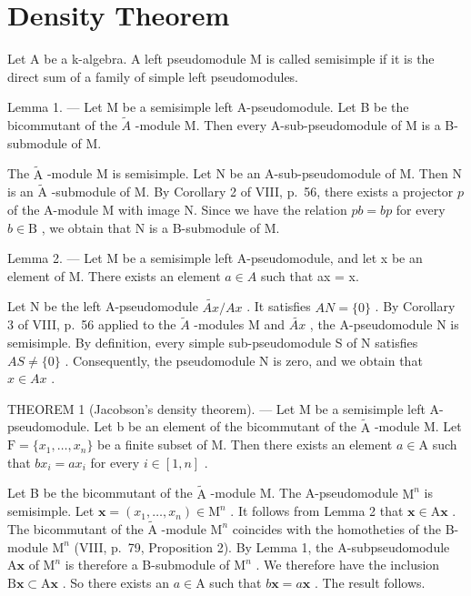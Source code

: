 \section{Density Theorem}

Let A be a k-algebra. A left pseudomodule M is called semisimple if it is the direct sum of a family of simple left pseudomodules.

Lemma 1. --- Let M be a semisimple left A-pseudomodule. Let B be the bicommutant of the \(\widetilde{A}\) -module M. Then every A-sub-pseudomodule of M is a B-submodule of M.

The \(\widetilde{\mathrm{A}}\) -module M is semisimple. Let N be an A-sub-pseudomodule of M. Then N is an \(\widetilde{\mathrm{A}}\) -submodule of M. By Corollary 2 of VIII, p.~56, there exists a projector \(p\) of the A-module M with image N. Since we have the relation \(pb = bp\) for every \(b \in \mathrm{B}\) , we obtain that N is a B-submodule of M.

Lemma 2. --- Let M be a semisimple left A-pseudomodule, and let x be an element of M. There exists an element \(a \in A\) such that ax = x.

Let N be the left A-pseudomodule \(\widetilde{Ax}/Ax\) . It satisfies \(AN = \{0\}\) . By Corollary 3 of VIII, p.~56 applied to the \(\widetilde{A}\) -modules M and \(\widetilde{Ax}\) , the A-pseudomodule N is semisimple. By definition, every simple sub-pseudomodule S of N satisfies \(AS \neq \{0\}\) . Consequently, the pseudomodule N is zero, and we obtain that \(x \in Ax\) .

THEOREM 1 (Jacobson's density theorem). --- Let M be a semisimple left A-pseudomodule. Let b be an element of the bicommutant of the \(\widetilde{\mathrm{A}}\) -module M. Let \(\mathrm{F} = \{x_1, \ldots, x_n\}\) be a finite subset of M. Then there exists an element \(a \in \mathrm{A}\) such that \(bx_i = ax_i\) for every \(i \in [1, n]\) .

Let B be the bicommutant of the \(\widetilde{\mathrm{A}}\) -module M. The A-pseudomodule \(\mathrm{M}^n\) is semisimple. Let \(\boldsymbol{x} = (x_1, \ldots, x_n) \in \mathrm{M}^n\) . It follows from Lemma 2 that \(\boldsymbol{x} \in \mathrm{A}\boldsymbol{x}\) . The bicommutant of the \(\widetilde{\mathrm{A}}\) -module \(\mathrm{M}^n\) coincides with the homotheties of the B-module \(\mathrm{M}^n\) (VIII, p.~79, Proposition 2). By Lemma 1, the A-subpseudomodule \(\mathrm{A}\boldsymbol{x}\) of \(\mathrm{M}^n\) is therefore a B-submodule of \(\mathrm{M}^n\) . We therefore have the inclusion \(\mathrm{B}\boldsymbol{x} \subset \mathrm{A}\boldsymbol{x}\) . So there exists an \(a \in \mathrm{A}\) such that \(b\boldsymbol{x} = a\boldsymbol{x}\) . The result follows.
\relax{}
